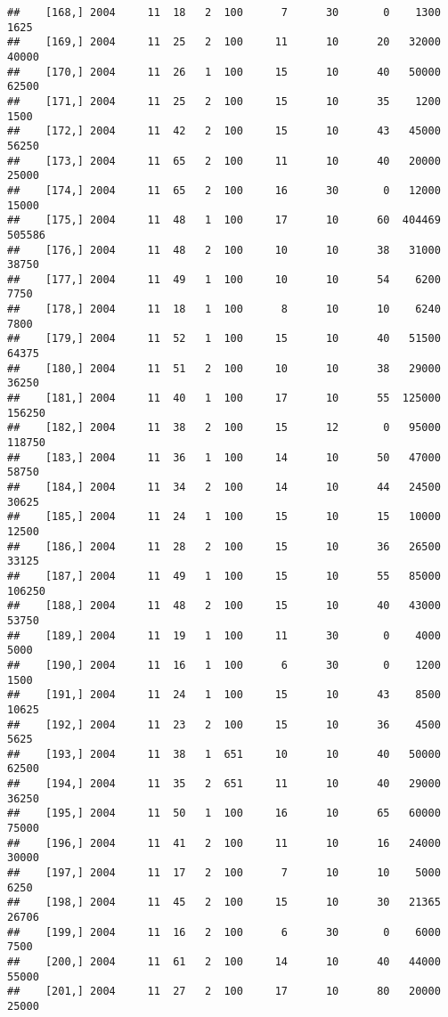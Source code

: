 \documentclass{article}\usepackage[]{graphicx}\usepackage[]{color}
\makeatletter
\newenvironment{kframe}{%
 \def\at@end@of@kframe{}%
 \ifinner\ifhmode%
  \def\at@end@of@kframe{\end{minipage}}%
  \begin{minipage}{\columnwidth}%
 \fi\fi%
 \def\FrameCommand##1{\hskip\@totalleftmargin \hskip-\fboxsep
 \colorbox{shadecolor}{##1}\hskip-\fboxsep
     \hskip-\linewidth \hskip-\@totalleftmargin \hskip\columnwidth}%
 \MakeFramed {\advance\hsize-\width
   \@totalleftmargin\z@ \linewidth\hsize
   \@setminipage}}%
 {\par\unskip\endMakeFramed%
 \at@end@of@kframe}
\newenvironment{knitrout}{}{} %
\makeatother
\begin{document}
\begin{knitrout}
\begin{kframe}
\begin{verbatim}
##    [168,] 2004     11  18   2  100      7      30       0    1300    1625
##    [169,] 2004     11  25   2  100     11      10      20   32000   40000
##    [170,] 2004     11  26   1  100     15      10      40   50000   62500
##    [171,] 2004     11  25   2  100     15      10      35    1200    1500
##    [172,] 2004     11  42   2  100     15      10      43   45000   56250
##    [173,] 2004     11  65   2  100     11      10      40   20000   25000
##    [174,] 2004     11  65   2  100     16      30       0   12000   15000
##    [175,] 2004     11  48   1  100     17      10      60  404469  505586
##    [176,] 2004     11  48   2  100     10      10      38   31000   38750
##    [177,] 2004     11  49   1  100     10      10      54    6200    7750
##    [178,] 2004     11  18   1  100      8      10      10    6240    7800
##    [179,] 2004     11  52   1  100     15      10      40   51500   64375
##    [180,] 2004     11  51   2  100     10      10      38   29000   36250
##    [181,] 2004     11  40   1  100     17      10      55  125000  156250
##    [182,] 2004     11  38   2  100     15      12       0   95000  118750
##    [183,] 2004     11  36   1  100     14      10      50   47000   58750
##    [184,] 2004     11  34   2  100     14      10      44   24500   30625
##    [185,] 2004     11  24   1  100     15      10      15   10000   12500
##    [186,] 2004     11  28   2  100     15      10      36   26500   33125
##    [187,] 2004     11  49   1  100     15      10      55   85000  106250
##    [188,] 2004     11  48   2  100     15      10      40   43000   53750
##    [189,] 2004     11  19   1  100     11      30       0    4000    5000
##    [190,] 2004     11  16   1  100      6      30       0    1200    1500
##    [191,] 2004     11  24   1  100     15      10      43    8500   10625
##    [192,] 2004     11  23   2  100     15      10      36    4500    5625
##    [193,] 2004     11  38   1  651     10      10      40   50000   62500
##    [194,] 2004     11  35   2  651     11      10      40   29000   36250
##    [195,] 2004     11  50   1  100     16      10      65   60000   75000
##    [196,] 2004     11  41   2  100     11      10      16   24000   30000
##    [197,] 2004     11  17   2  100      7      10      10    5000    6250
##    [198,] 2004     11  45   2  100     15      10      30   21365   26706
##    [199,] 2004     11  16   2  100      6      30       0    6000    7500
##    [200,] 2004     11  61   2  100     14      10      40   44000   55000
##    [201,] 2004     11  27   2  100     17      10      80   20000   25000

\end{verbatim}
\end{kframe}
\end{knitrout}
\end{document}
